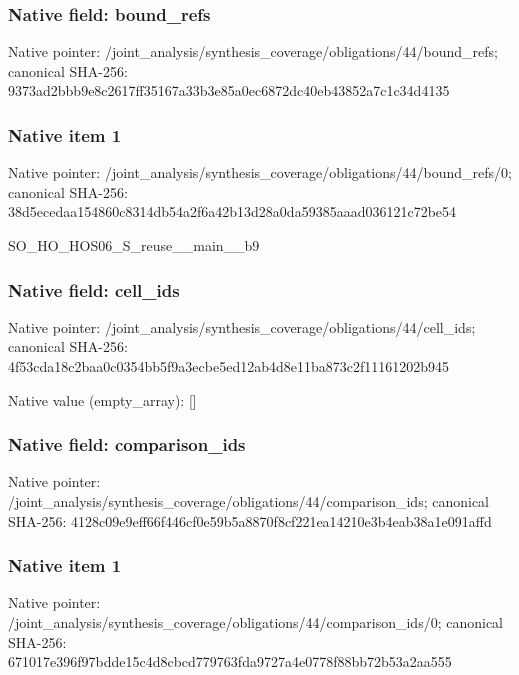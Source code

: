 \documentclass[10pt,a4paper]{article}
\begin{document}
\subsubsection{Native field: bound\_\allowbreak{}refs}
Native pointer: /joint\_\allowbreak{}analysis/synthesis\_\allowbreak{}coverage/obligations/44/bound\_\allowbreak{}refs; canonical SHA-256: 9373ad2bbb9e8c2617ff35167a33b3e85a0ec6872dc40eb43852a7c1c34d4135

\subsubsection{Native item 1}
Native pointer: /joint\_\allowbreak{}analysis/synthesis\_\allowbreak{}coverage/obligations/44/bound\_\allowbreak{}refs/0; canonical SHA-256: 38d5ecedaa154860c8314db54a2f6a42b13d28a0da59385aaad036121c72be54

\begingroup\raggedright\sloppy SO\_\allowbreak{}HO\_\allowbreak{}HOS06\_\allowbreak{}S\_\allowbreak{}reuse\_\allowbreak{}\_\allowbreak{}main\_\allowbreak{}\_\allowbreak{}b9\par\endgroup

\subsubsection{Native field: cell\_\allowbreak{}ids}
Native pointer: /joint\_\allowbreak{}analysis/synthesis\_\allowbreak{}coverage/obligations/44/cell\_\allowbreak{}ids; canonical SHA-256: 4f53cda18c2baa0c0354bb5f9a3ecbe5ed12ab4d8e11ba873c2f11161202b945

Native value (empty\_\allowbreak{}array): []

\subsubsection{Native field: comparison\_\allowbreak{}ids}
Native pointer: /joint\_\allowbreak{}analysis/synthesis\_\allowbreak{}coverage/obligations/44/comparison\_\allowbreak{}ids; canonical SHA-256: 4128c09e9eff66f446cf0e59b5a8870f8cf221ea14210e3b4eab38a1e091affd

\subsubsection{Native item 1}
Native pointer: /joint\_\allowbreak{}analysis/synthesis\_\allowbreak{}coverage/obligations/44/comparison\_\allowbreak{}ids/0; canonical SHA-256: 671017e396f97bdde15c4d8cbcd779763fda9727a4e0778f88bb72b53a2aa555
\end{document}
